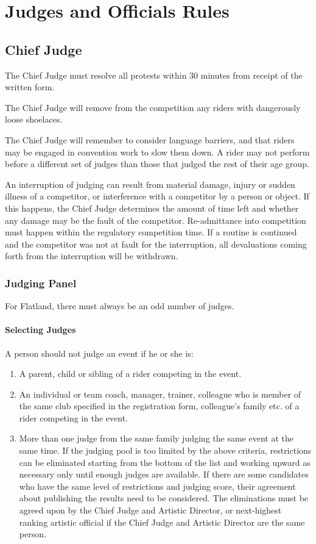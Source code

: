 \chapter{Judges and Officials Rules}

\section{Chief Judge}

The Chief Judge must resolve all protests within 30 minutes from receipt of the written form.

The Chief Judge will remove from the competition any riders with dangerously loose shoelaces. 

The Chief Judge will remember to consider language barriers, and that riders may be engaged in convention work to slow them down.
A rider may not perform before a different set of judges than those that judged the rest of their age group.

An interruption of judging can result from material damage, injury or sudden illness of a competitor, or interference with a competitor by a person or object.
If this happens, the Chief Judge determines the amount of time left and whether any damage may be the fault of the competitor.
Re-admittance into competition must happen within the regulatory competition time.
If a routine is continued and the competitor was not at fault for the interruption, all devaluations coming forth from the interruption will be withdrawn.

\subsection{Judging Panel}
For Flatland, there must always be an odd number of judges.

\subsubsection{Selecting Judges}
A person should not judge an event if he or she is:
\begin{enumerate}
\item A parent, child or sibling of a rider competing in the event.
\item An individual or team coach, manager, trainer, colleague who is member of the same club specified in the registration form, colleague's family etc. of a rider competing in the event.
\item More than one judge from the same family judging the same event at the same time.
If the judging pool is too limited by the above criteria, restrictions can be eliminated starting from the bottom of the list and working upward as necessary only until enough judges are available.
If there are some candidates who have the same level of restrictions and judging score, their agreement about publishing the results need to be considered.
The eliminations must be agreed upon by the Chief Judge and Artistic Director, or next-highest ranking artistic official if the Chief Judge and Artistic Director are the same person.
\end{enumerate}

